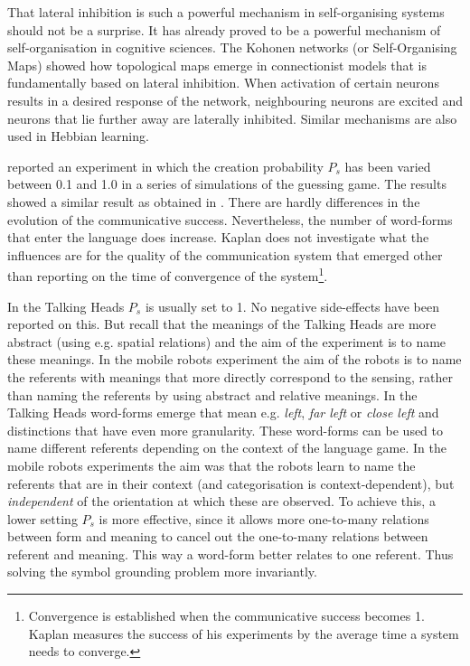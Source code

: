 That lateral inhibition is such a powerful mechanism in self-organising systems should not be a surprise. It has already proved to be a powerful mechanism of self-organisation in cognitive sciences. The Kohonen networks (or Self-Organising Maps) showed how topological maps emerge in connectionist models that is fundamentally based on lateral inhibition. When activation of certain neurons results in a desired response of the network, neighbouring neurons are excited and neurons that lie further away are laterally inhibited. Similar mechanisms are also used in Hebbian learning.


\citet{kaplan:2000} reported an experiment in which the creation probability $P_s$ has been varied between 0.1 and 1.0 in a series of simulations of the guessing game. The results showed a similar result as obtained in . There are hardly differences in the evolution of the communicative success. Nevertheless, the number of word-forms that enter the language does increase. Kaplan does not investigate what the influences are for the quality of the communication system that emerged other than reporting on the time of convergence of the system\footnote{Convergence is established when the communicative success becomes 1. Kaplan measures the success of his experiments by the average time a system needs to converge.}. 

In the Talking Heads $P_s$ is usually set to 1. No negative side-effects have been reported on this. But recall that the meanings of the Talking Heads are more abstract (using e.g. spatial relations) and the aim of the experiment is to name these meanings. In the mobile robots experiment the aim of the robots is to name the referents with meanings that more directly correspond to the sensing, rather than naming the referents by using abstract and relative meanings. In the Talking Heads word-forms emerge that mean e.g. {\em left}, {\em far left} or {\em close left} and distinctions that have even more granularity. These word-forms can be used to name different referents depending on the context of the language game. In the mobile robots experiments the aim was that the robots learn to name the referents that are in their context (and categorisation is context-dependent), but {\em independent} of the orientation at which these are observed. To achieve this, a lower setting $P_s$ is more effective, since it allows more one-to-many relations between form and meaning to cancel out the one-to-many relations between referent and meaning. This way a word-form better relates to one referent. Thus solving the symbol grounding problem more invariantly.


